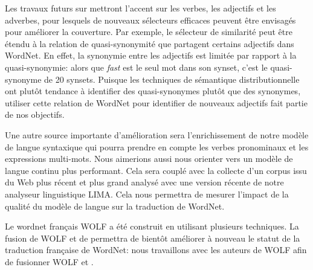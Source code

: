 Les travaux futurs sur \newjaws{} mettront l'accent sur les verbes, les adjectifs et les adverbes, pour lesquels de nouveaux sélecteurs efficaces peuvent être envisagés pour améliorer la couverture. Par exemple, le sélecteur de similarité peut être étendu à la relation de quasi-synonymité que partagent certains adjectifs dans WordNet. En effet, la synonymie entre les adjectifs est limitée par rapport à la quasi-synonymie: alors que \textit{fast} est le seul mot dans son synset, c'est le quasi-synonyme de 20 synsets. Puisque les techniques de sémantique distributionnelle ont plutôt tendance à identifier des quasi-synonymes plutôt que des synonymes, utiliser cette relation de WordNet pour identifier de nouveaux adjectifs fait partie de nos objectifs.

Une autre source importante d'amélioration sera l'enrichissement de notre modèle de langue syntaxique qui pourra prendre en compte les verbes pronominaux et les expressions multi-mots. Nous aimerions aussi nous orienter vers un modèle de langue continu \citep{haison2012continuous} plus performant. Cela sera couplé avec la collecte d'un corpus issu du Web plus récent et plus grand analysé avec une version récente de notre analyseur linguistique LIMA. Cela nous permettra de mesurer l'impact de la qualité du modèle de langue sur la traduction de WordNet.

Le wordnet français WOLF a été construit en utilisant plusieurs techniques. La fusion de WOLF et de \newjaws{} permettra de bientôt améliorer à nouveau le statut de la traduction française de WordNet: nous travaillons avec les auteurs de WOLF afin de fusionner WOLF et \newjaws{}.

